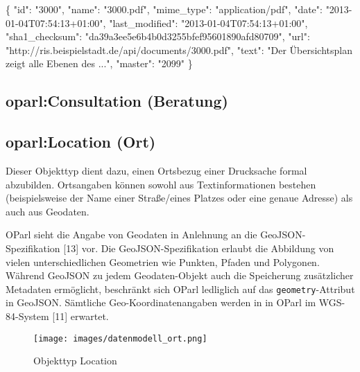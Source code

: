 \documentclass[,a4paper]{article}
\makeatletter
\newenvironment{Shaded}{}{}
\newcommand{\DataTypeTok}[1]{\textcolor[rgb]{0.56,0.13,0.00}{{#1}}}
\newcommand{\StringTok}[1]{\textcolor[rgb]{0.25,0.44,0.63}{{#1}}}
\newcommand{\NormalTok}[1]{{#1}}
\def\maxwidth{\ifdim\Gin@nat@width>\linewidth\linewidth
\else\Gin@nat@width\fi}
\let\Oldincludegraphics\includegraphics
\renewcommand{\includegraphics}[1]{\Oldincludegraphics[width=\maxwidth]{#1}}
\makeatother
\begin{document}
\begin{Shaded}
\begin{Highlighting}[]
\NormalTok{\{}
    \DataTypeTok{"id"}\NormalTok{: }\StringTok{"3000"}\NormalTok{,}
    \DataTypeTok{"name"}\NormalTok{: }\StringTok{"3000.pdf"}\NormalTok{,}
    \DataTypeTok{"mime_type"}\NormalTok{: }\StringTok{"application/pdf"}\NormalTok{,}
    \DataTypeTok{"date"}\NormalTok{: }\StringTok{"2013-01-04T07:54:13+01:00"}\NormalTok{,}
    \DataTypeTok{"last_modified"}\NormalTok{: }\StringTok{"2013-01-04T07:54:13+01:00"}\NormalTok{,}
    \DataTypeTok{"sha1_checksum"}\NormalTok{: }\StringTok{"da39a3ee5e6b4b0d3255bfef95601890afd80709"}\NormalTok{,}
    \DataTypeTok{"url"}\NormalTok{: }\StringTok{"http://ris.beispielstadt.de/api/documents/3000.pdf"}\NormalTok{,}
    \DataTypeTok{"text"}\NormalTok{: }\StringTok{"Der Übersichtsplan zeigt alle Ebenen des ..."}\NormalTok{,}
    \DataTypeTok{"master"}\NormalTok{: }\StringTok{"2099"}
\NormalTok{\}}
\end{Highlighting}
\end{Shaded}

\subsection{oparl:Consultation (Beratung)}

\subsection{oparl:Location (Ort)}

Dieser Objekttyp dient dazu, einen Ortsbezug einer Drucksache formal
abzubilden. Ortsangaben können sowohl aus Textinformationen bestehen
(beispielsweise der Name einer Straße/eines Platzes oder eine genaue
Adresse) als auch aus Geodaten.

OParl sieht die Angabe von Geodaten in Anlehnung an die
GeoJSON-Spezifikation {[}13{]} vor. Die GeoJSON-Spezifikation erlaubt
die Abbildung von vielen unterschiedlichen Geometrien wie Punkten,
Pfaden und Polygonen. Während GeoJSON zu jedem Geodaten-Objekt auch die
Speicherung zusätzlicher Metadaten ermöglicht, beschränkt sich OParl
ledliglich auf das \texttt{geometry}-Attribut in GeoJSON. Sämtliche
Geo-Koordinatenangaben werden in in OParl im WGS-84-System {[}11{]}
erwartet.

\begin{figure}[htbp]
\centering
\texttt{[image: images/datenmodell\_ort.png]}
\caption{Objekttyp Location}
\end{figure}
\end{document}
